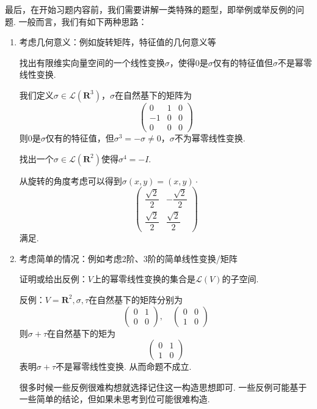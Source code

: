 最后，在开始习题内容前，我们需要讲解一类特殊的题型，即举例或举反例的问题. 一般而言，我们有如下两种思路：
\begin{enumerate}
    \item 考虑几何意义：例如旋转矩阵，特征值的几何意义等
          \begin{example}{}{}
              找出有限维实向量空间的一个线性变换$\sigma$，使得0是$\sigma$仅有的特征值但$\sigma$不是幂零线性变换.
          \end{example}
          \begin{solution}
            我们定义$\sigma\in\mathcal{L}({\mathbf{R}^3})$，$\sigma$在自然基下的矩阵为
            \[ \begin{pmatrix}
                0 & 1 & 0 \\
                -1 & 0 & 0 \\
                0 & 0 & 0
            \end{pmatrix} \]
            则$0$是$\sigma$仅有的特征值，但$\sigma^3=-\sigma\neq 0$，$\sigma$不为幂零线性变换.
          \end{solution}
          \begin{example}{}{}
              找出一个$\sigma\in \mathcal{L}(\mathbf{R}^2)$使得$\sigma^4=-I$.
          \end{example}
          \begin{solution}
            从旋转的角度考虑可以得到$\sigma(x,y)=(x,y)\cdot$
            \[ \begin{pmatrix}
                \dfrac{\sqrt{2}}{2} & -\dfrac{\sqrt{2}}{2} \\[2ex]
                \dfrac{\sqrt{2}}{2} & \dfrac{\sqrt{2}}{2}
            \end{pmatrix} \]
            满足.
          \end{solution}
    \item 考虑简单的情况：例如考虑2阶、3阶的简单线性变换/矩阵
          \begin{example}{}{}
              证明或给出反例：$V$上的幂零线性变换的集合是$\mathcal{L}(V)$的子空间.
          \end{example}
          \begin{solution}
            反例：$V=\mathbf{R}^2,\sigma,\tau$在自然基下的矩阵分别为
            \[ \begin{pmatrix}
                0 & 1 \\
                0 & 0
            \end{pmatrix}, \quad
            \begin{pmatrix}
                0 & 0 \\
                1 & 0
            \end{pmatrix}\]
            则$\sigma+\tau$在自然基下的矩为
            \[ \begin{pmatrix}
                0 & 1 \\
                1 & 0
            \end{pmatrix} \]
            表明$\sigma+\tau$不是幂零线性变换. 从而命题不成立.
          \end{solution}
          很多时候一些反例很难构想就选择记住这一构造思想即可. 一些反例可能基于一些简单的结论，但如果未思考到位可能很难构造.
\end{enumerate}

